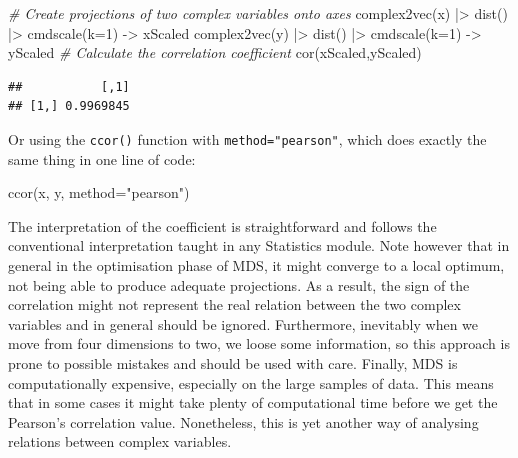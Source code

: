 \documentclass[
]{book}
\newenvironment{Shaded}{\begin{snugshade}}{\end{snugshade}}
\newcommand{\AttributeTok}[1]{\textcolor[rgb]{0.77,0.63,0.00}{#1}}
\newcommand{\CommentTok}[1]{\textcolor[rgb]{0.56,0.35,0.01}{\textit{#1}}}
\newcommand{\DecValTok}[1]{\textcolor[rgb]{0.00,0.00,0.81}{#1}}
\newcommand{\FunctionTok}[1]{\textcolor[rgb]{0.00,0.00,0.00}{#1}}
\newcommand{\NormalTok}[1]{#1}
\newcommand{\OtherTok}[1]{\textcolor[rgb]{0.56,0.35,0.01}{#1}}
\newcommand{\SpecialCharTok}[1]{\textcolor[rgb]{0.00,0.00,0.00}{#1}}
\newcommand{\StringTok}[1]{\textcolor[rgb]{0.31,0.60,0.02}{#1}}
\begin{document}
\begin{Shaded}
\begin{Highlighting}[]
\CommentTok{\# Create projections of two complex variables onto axes}
\FunctionTok{complex2vec}\NormalTok{(x) }\SpecialCharTok{|\textgreater{}} \FunctionTok{dist}\NormalTok{() }\SpecialCharTok{|\textgreater{}} \FunctionTok{cmdscale}\NormalTok{(}\AttributeTok{k=}\DecValTok{1}\NormalTok{) }\OtherTok{{-}\textgreater{}}\NormalTok{ xScaled}
\FunctionTok{complex2vec}\NormalTok{(y) }\SpecialCharTok{|\textgreater{}} \FunctionTok{dist}\NormalTok{() }\SpecialCharTok{|\textgreater{}} \FunctionTok{cmdscale}\NormalTok{(}\AttributeTok{k=}\DecValTok{1}\NormalTok{) }\OtherTok{{-}\textgreater{}}\NormalTok{ yScaled}
\CommentTok{\# Calculate the correlation coefficient}
\FunctionTok{cor}\NormalTok{(xScaled,yScaled)}
\end{Highlighting}
\end{Shaded}

\begin{verbatim}
##           [,1]
## [1,] 0.9969845
\end{verbatim}

Or using the \texttt{ccor()} function with \texttt{method="pearson"}, which does exactly the same thing in one line of code:

\begin{Shaded}
\begin{Highlighting}[]
\FunctionTok{ccor}\NormalTok{(x, y, }\AttributeTok{method=}\StringTok{"pearson"}\NormalTok{)}
\end{Highlighting}
\end{Shaded}

The interpretation of the coefficient is straightforward and follows the conventional interpretation taught in any Statistics module. Note however that in general in the optimisation phase of MDS, it might converge to a local optimum, not being able to produce adequate projections. As a result, the sign of the correlation might not represent the real relation between the two complex variables and in general should be ignored. Furthermore, inevitably when we move from four dimensions to two, we loose some information, so this approach is prone to possible mistakes and should be used with care. Finally, MDS is computationally expensive, especially on the large samples of data. This means that in some cases it might take plenty of computational time before we get the Pearson's correlation value. Nonetheless, this is yet another way of analysing relations between complex variables.
\end{document}
